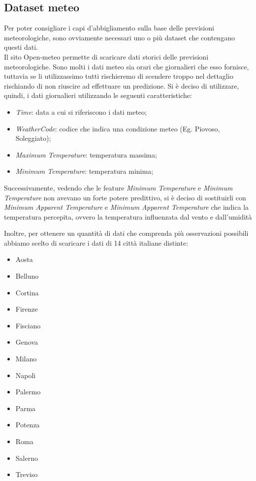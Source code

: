 \documentclass[a4paper, 11pt, oneside]{report}
\begin{document}
                \subsection{Dataset meteo}
                Per poter consigliare i capi d'abbigliamento sulla base delle previsioni meteorologiche, sono ovviamente necessari
                uno o più dataset che contengano questi dati.\\
                Il sito Open-meteo \cite{9} permette di scaricare dati storici delle previsioni meteorologiche.
                Sono molti i dati meteo sia orari che giornalieri che esso fornisce, tuttavia se li utilizzassimo tutti
                rischieremo di scendere troppo nel dettaglio rischiando di non riuscire ad effettuare un predizione.
                Si è deciso di utilizzare, quindi, i dati giornalieri utilizzando le seguenti caratteristiche:
                \begin{itemize}
                    \item \emph{Time}: data a cui si riferiscono i dati meteo;
                    \item \emph{WeatherCode}: codice che indica una condizione meteo (Eg. Piovoso, Soleggiato);
                    \item \emph{Maximum Temperature}: temperatura massima;
                    \item \emph{Minimum Temperature}: temperatura minima;
                \end{itemize}
                Successivamente, vedendo che le feature \emph{Minimum Temperature} e \emph{Minimum Temperature} non avevano un
                forte potere predittivo, si è deciso di sostituirli con \emph{Minimum Apparent Temperature}
                e \emph{Minimum Apparent Temperature} che indica la temperatura percepita, ovvero la temperatura influenzata dal vento e dall'umidità
                \\
                \par \noindent Inoltre, per ottenere un quantità di dati che comprenda più osservazioni possibili abbiamo scelto di scaricare i dati di
                14 città italiane distinte:
                \begin{itemize}
                    \item Aosta
                    \item Belluno
                    \item Cortina
                    \item Firenze
                    \item Fisciano
                    \item Genova
                    \item Milano
                    \item Napoli
                    \item Palermo
                    \item Parma
                    \item Potenza
                    \item Roma
                    \item Salerno
                    \item Treviso
                \end{itemize}
\end{document}
